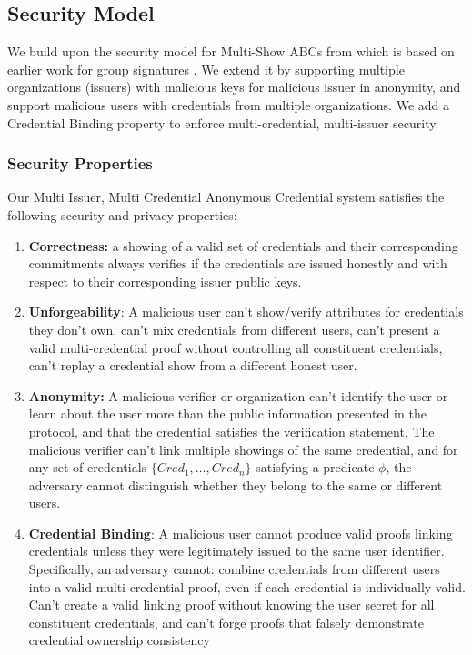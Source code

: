 \subsection{Security Model}
We build upon the security model for Multi-Show ABCs from \cite{fuchsbauer_structure-preserving_2019} which is based on earlier work for group signatures \cite{hutchison_foundations_2005}. We extend it by supporting multiple organizations (issuers) with malicious keys for malicious issuer in anonymity, and support malicious users with credentials from multiple organizations. We add a Credential Binding property to enforce multi-credential, multi-issuer security.

\subsubsection{Security Properties}
Our Multi Issuer, Multi Credential Anonymous Credential system satisfies the following security and privacy properties:
\begin{enumerate}
    \item \textbf{Correctness: } a showing of a valid set of credentials and their corresponding commitments always verifies if the credentials are issued honestly and with respect to their corresponding issuer public keys. 
    
    \item \textbf{Unforgeability}: A malicious user can't show/verify attributes for credentials they don't own, can't mix credentials from different users, can't present a valid multi-credential proof without controlling all constituent credentials, can't replay a credential show from a different honest user. 
    
    \item \textbf{Anonymity:} A malicious verifier or organization can't identify the user or learn about the user more than the public information presented in the protocol, and that the credential satisfies the verification statement. The malicious verifier can't link multiple showings of the same credential, and for any set of credentials $\{Cred_1,\dots,Cred_n\}$ satisfying a predicate $\phi$, the adversary cannot distinguish whether they belong to the same or different users.

    \item \textbf{Credential Binding}: A malicious user cannot produce valid proofs linking credentials unless they were legitimately issued to the same user identifier. Specifically, an adversary cannot: combine credentials from different users into a valid multi-credential proof, even if each credential is individually valid. Can't create a valid linking proof without knowing the user secret for all constituent credentials, and can't forge proofs that falsely demonstrate credential ownership consistency

\end{enumerate}

